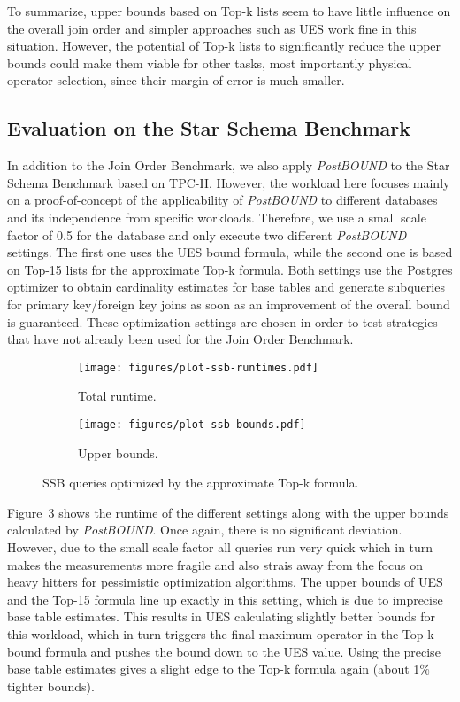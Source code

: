 To summarize, upper bounds based on Top-k lists seem to have little influence on the overall join order and simpler approaches such as UES work fine in this situation. However, the potential of Top-k lists to significantly reduce the upper bounds could make them viable for other tasks, most importantly physical operator selection, since their margin of error is much smaller.

\subsection{Evaluation on the Star Schema Benchmark}
\label{sec:eval-ssb}

In addition to the Join Order Benchmark, we also apply \emph{PostBOUND} to the Star Schema Benchmark based on TPC-H. However, the workload here focuses mainly on a proof-of-concept of the applicability of \emph{PostBOUND} to different databases and its independence from specific workloads. Therefore, we use a small scale factor of 0.5 for the database and only execute two different \emph{PostBOUND} settings. The first one uses the UES bound formula, while the second one is based on Top-15 lists for the approximate Top-k formula. Both settings use the Postgres optimizer to obtain cardinality estimates for base tables and generate subqueries for primary key/foreign key joins as soon as an improvement of the overall bound is guaranteed. These optimization settings are chosen in order to test strategies that have not already been used for the Join Order Benchmark.

\begin{figure}[tb]
	\centering
	\begin{subfigure}[b]{0.47\textwidth}
	    \centering
	    \texttt{[image: figures/plot-ssb-runtimes.pdf]}
	    \caption{Total runtime.}
	    \label{fig:results-ssb-runtimes}
	\end{subfigure}
	\begin{subfigure}[b]{0.47\textwidth}
	    \centering
	    \texttt{[image: figures/plot-ssb-bounds.pdf]}
	    \caption{Upper bounds.}
	    \label{fig:results-ssb-bounds}
	\end{subfigure}
	\caption{SSB queries optimized by the approximate Top-k formula.}
	\label{fig:results-ssb}
\end{figure}

Figure~\ref{fig:results-ssb} shows the runtime of the different settings along with the upper bounds calculated by \emph{PostBOUND}. Once again, there is no significant deviation. However, due to the small scale factor all queries run very quick which in turn makes the measurements more fragile and also strais away from the focus on heavy hitters for pessimistic optimization algorithms. The upper bounds of UES and the Top-15 formula line up exactly in this setting, which is due to imprecise base table estimates. This results in UES calculating slightly better bounds for this workload, which in turn triggers the final maximum operator in the Top-k bound formula and pushes the bound down to the UES value. Using the precise base table estimates gives a slight edge to the Top-k formula again (about 1\% tighter bounds).
